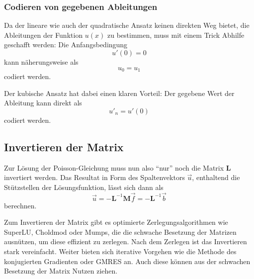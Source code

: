 \subsubsection{Codieren von gegebenen Ableitungen}
Da der lineare wie auch der quadratische Ansatz keinen direkten Weg bietet, die Ableitungen der Funktion $u(x)$ zu bestimmen, muss mit einem Trick Abhilfe geschafft werden: 
Die Anfangsbedingung
\begin{equation}
    u'(0) = 0
\end{equation}
kann näherungsweise als 
\begin{equation}
    u_0 = u_1
\end{equation}
codiert werden. 

Der kubische Ansatz hat dabei einen klaren Vorteil: 
Der gegebene Wert der Ableitung kann direkt als 
\begin{equation}
    u'_n = u'(0)
\end{equation}
codiert werden.


\subsection{Invertieren der Matrix\label{fem:1d:matrix_invertieren}}
Zur Lösung der Poisson-Gleichung muss nun also ``nur'' noch die Matrix $\mathbf{L}$ invertiert werden.
Das Resultat in Form des Spaltenvektors $\vec{u}$, enthaltend die Stützstellen der Lösungsfunktion, lässt sich dann als
\begin{equation}
    \vec{u} = - \mathbf{L}^{-1}\mathbf{M}\vec{f} = - \mathbf{L}^{-1}\vec{b}
\end{equation}
berechnen.

Zum Invertieren der Matrix gibt es optimierte Zerlegungsalgorithmen wie SuperLU, Choldmod oder Mumps, die die schwache Besetzung der Matrizen ausnützen, um diese effizient zu zerlegen.
Nach dem Zerlegen ist das Invertieren stark vereinfacht.
Weiter bieten sich iterative Vorgehen wie die Methode des konjugierten Gradienten oder GMRES an.
Auch diese können aus der schwachen Besetzung der Matrix Nutzen ziehen.
